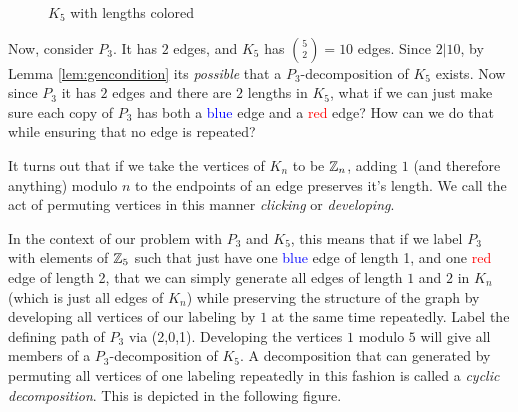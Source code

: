 \begin{figure}[H]
  \begin{center}
  \end{center}
  \caption{$K_{5}$ with lengths colored}
  \label{fig:K5colored}
\end{figure}
Now, consider $P_{3}$. It has $2$ edges, and $K_{5}$ has $\binom{5}{2}=10$ edges. Since $2|10$, by Lemma \ref{lem:gencondition} its \textit{possible} that a $P_{3}$-decomposition of $K_{5}$ exists. Now since $P_{3}$ it has $2$ edges and there are $2$ lengths in $K_{5}$, what if we can just make sure each copy of $P_{3}$ has both a \textcolor{blue}{blue} edge and a \textcolor{red}{red} edge? How can we do that while ensuring that no edge is repeated?

It turns out that if we take the vertices of $K_{n}$ to be $\mathbb{Z}_{n}$, adding $1$ (and therefore anything) modulo $n$ to the endpoints of an edge preserves it's length. We call the act of permuting vertices in this manner \textit{clicking} or \textit{developing}.

In the context of our problem with $P_{3}$ and $K_{5}$, this means that if we label $P_{3}$ with elements of $\mathbb{Z}_{5}$ such that just have one \textcolor{blue}{blue} edge of length 1, and one \textcolor{red}{red} edge of length 2, that we can simply generate all edges of length $1$ and $2$ in $K_{n}$ (which is just all edges of $K_{n}$) while preserving the structure of the graph by developing all vertices of our labeling by $1$ at the same time repeatedly. Label the defining path of $P_{3}$ via (2,0,1). Developing the vertices $1$ modulo $5$ will give all members of a $P_{3}$-decomposition of $K_{5}$. A decomposition that can generated by permuting all vertices of one labeling repeatedly in this fashion is called a \textit{cyclic decomposition}. This is depicted in the following figure.

